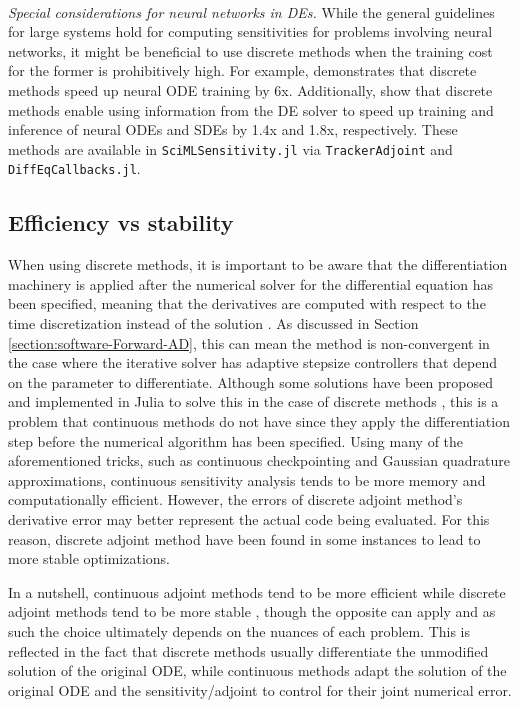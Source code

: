 ~\\
\noindent
\textit{Special considerations for neural networks in DEs.} While the general guidelines for large systems hold for computing sensitivities for problems involving neural networks, it might be beneficial to use discrete methods when the training cost for the former is prohibitively high. 
For example, \cite{Onken_Ruthotto_2020} demonstrates that discrete methods speed up neural ODE training by 6x. 
Additionally, \cite{pal2021opening} show that discrete methods enable using information from the DE solver to speed up training and inference of neural ODEs and SDEs by 1.4x and 1.8x, respectively. 
These methods are available in \texttt{SciMLSensitivity.jl} via \texttt{TrackerAdjoint} and \texttt{DiffEqCallbacks.jl}.

\subsection*{Efficiency vs stability}

When using discrete methods, it is important to be aware that the differentiation machinery is applied after the numerical solver for the differential equation has been specified, meaning that the derivatives are computed with respect to the time discretization instead of the solution \cite{Eberhard_Bischof_1996}.
As discussed in Section \ref{section:software-Forward-AD}, this can mean the method is non-convergent in the case where the iterative solver has adaptive stepsize controllers that depend on the parameter to differentiate.
Although some solutions have been proposed and implemented in Julia to solve this in the case of discrete methods \cite{Eberhard_Bischof_1996}, this is a problem that continuous methods do not have since they apply the differentiation step before the numerical algorithm has been specified. 
Using many of the aforementioned tricks, such as continuous checkpointing and Gaussian quadrature approximations, continuous sensitivity analysis tends to be more memory and computationally efficient. 
However, the errors of discrete adjoint method's derivative error may better represent the actual code being evaluated. 
For this reason, discrete adjoint method have been found in some instances to lead to more stable optimizations. 

In a nutshell, continuous adjoint methods tend to be more efficient while discrete adjoint methods tend to be more stable \cite{rackauckas2020universal}, though the opposite can apply and as such the choice ultimately depends on the nuances of each problem.
This is reflected in the fact that discrete methods usually differentiate the unmodified solution of the original ODE, while continuous methods adapt the solution of the original ODE and the sensitivity/adjoint to control for their joint numerical error. 

